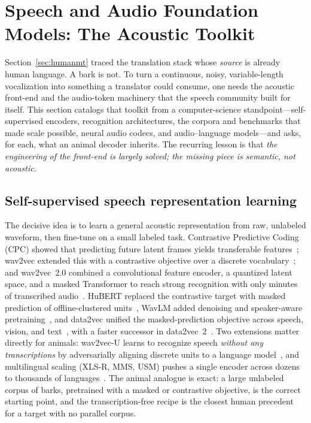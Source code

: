 \section{Speech and Audio Foundation Models: The Acoustic Toolkit}
\label{sec:foundationaudio}

Section~\ref{sec:humanmt} traced the translation stack whose \emph{source} is
already human language. A bark is not. To turn a continuous, noisy,
variable-length vocalization into something a translator could consume, one
needs the acoustic front-end and the audio-token machinery that the speech
community built for itself. This section catalogs that toolkit from a
computer-science standpoint---self-supervised encoders, recognition
architectures, the corpora and benchmarks that made scale possible, neural
audio codecs, and audio--language models---and asks, for each, what an animal
decoder inherits. The recurring lesson is that \emph{the engineering of the
front-end is largely solved; the missing piece is semantic, not acoustic}.

\subsection{Self-supervised speech representation learning}
The decisive idea is to learn a general acoustic representation from raw,
unlabeled waveform, then fine-tune on a small labeled task. Contrastive
Predictive Coding (CPC) showed that predicting future latent frames yields
transferable features~\cite{vandenoord2018cpc}; wav2vec extended this with a
contrastive objective over a discrete vocabulary~\cite{schneider2019wav2vec};
and wav2vec~2.0 combined a convolutional feature encoder, a quantized latent
space, and a masked Transformer to reach strong recognition with only minutes
of transcribed audio~\cite{baevski2020wav2vec2}. HuBERT replaced the
contrastive target with masked prediction of offline-clustered
units~\cite{hsu2021hubert}, WavLM added denoising and speaker-aware
pretraining~\cite{chen2022wavlm}, and data2vec unified the masked-prediction
objective across speech, vision, and text~\cite{baevski2022data2vec}, with a
faster successor in data2vec~2~\cite{baevski2023data2vec2}. Two extensions
matter directly for animals: wav2vec-U learns to recognize speech
\emph{without any transcriptions} by adversarially aligning discrete units to
a language model~\cite{baevski2021wav2vecu}, and multilingual scaling
(XLS-R, MMS, USM) pushes a single encoder across dozens to thousands of
languages~\cite{babu2022xlsr,pratap2023mms,zhang2023usm}. The animal analogue
is exact: a large unlabeled corpus of barks, pretrained with a masked or
contrastive objective, is the correct starting point, and the
transcription-free recipe is the closest human precedent for a target with no
parallel corpus.

